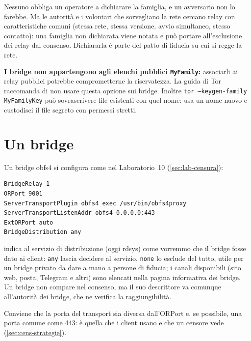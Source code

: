 \begin{approfondimento}
Nessuno obbliga un operatore a dichiarare la famiglia, e un avversario non lo farebbe. Ma le autorità e i volontari che sorvegliano la rete cercano relay con caratteristiche comuni (stessa rete, stessa versione, avvio simultaneo, stesso contatto): una famiglia non dichiarata viene notata e può portare all'esclusione dei relay dal consenso. Dichiararla è parte del patto di fiducia su cui si regge la rete.
\end{approfondimento}

\textbf{I bridge non appartengono agli elenchi pubblici \texttt{MyFamily}:} associarli ai relay pubblici potrebbe comprometterne la riservatezza. La guida di Tor raccomanda di non usare questa opzione sui bridge. Inoltre \texttt{tor --keygen-family MyFamilyKey} può sovrascrivere file esistenti con quel nome: usa un nome nuovo e custodisci il file segreto con permessi stretti.

\section{Un bridge}\label{sec:relay-bridge}

Un bridge obfs4 si configura come nel Laboratorio~10 (\cref{sec:lab-censura}):
\begin{lstlisting}[numbers=none]
BridgeRelay 1
ORPort 9001
ServerTransportPlugin obfs4 exec /usr/bin/obfs4proxy
ServerTransportListenAddr obfs4 0.0.0.0:443
ExtORPort auto
BridgeDistribution any
\end{lstlisting}
 indica al servizio di distribuzione (oggi rdsys) come vorremmo che il bridge fosse dato ai client: \texttt{any} lascia decidere al servizio, \texttt{none} lo esclude del tutto, utile per un bridge privato da dare a mano a persone di fiducia; i canali disponibili (sito web, posta, Telegram e altri) sono elencati nella pagina informativa dei bridge. Un bridge non compare nel consenso, ma il suo descrittore va comunque all'autorità dei bridge, che ne verifica la raggiungibilità.

Conviene che la porta del transport sia diversa dall'ORPort e, se possibile, una porta comune come 443: è quella che i client usano e che un censore vede (\cref{sec:cens-strategie}).

